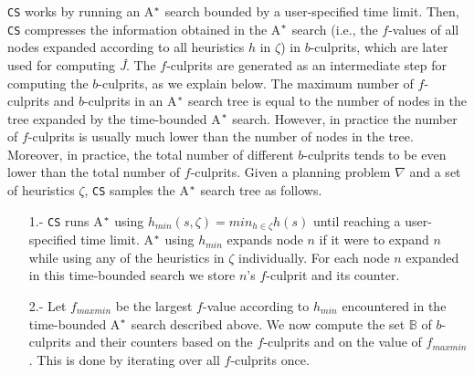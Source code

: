 \texttt{CS} works by running an A$\sp{*}$ search bounded by a user-specified time limit. Then, \texttt{CS} compresses the information obtained in the A$\sp{*}$ search (i.e., the $f$-values of all nodes expanded according to all heuristics $h$ in $\zeta$) in $b$-culprits, which are later used for computing \textit{\^{J}}. The $f$-culprits are generated as an intermediate step for computing the $b$-culprits, as we explain below. The maximum number of $f$-culprits and $b$-culprits in an A$\sp{*}$ search tree is equal to the number of nodes in the tree expanded by the time-bounded A$\sp{*}$ search. However, in practice the number of $f$-culprits is usually much lower than the number of nodes in the tree. Moreover, in practice, the total number of different $b$-culprits tends to be even lower than the total number of $f$-culprits. Given a planning problem $\nabla$ and a set of heuristics $\zeta$, \texttt{CS} samples the A$\sp{*}$ search tree as follows.

\begin{enumerate}
    \item[1.-] \texttt{CS} runs A$\sp{*}$ using $h_{min}(s,\zeta) = min_{h \in \zeta}h(s)$ until reaching a user-specified time limit. A$\sp{*}$ using $h_{min}$ expands node $n$ if it were to expand $n$ while using any of the heuristics in $\zeta$ individually. For each node $n$ expanded in this time-bounded search we store $n$'s $f$-culprit and its counter.
    \item[2.-] Let $f_{maxmin}$ be the largest $f$-value according to $h_{min}$ encountered in the time-bounded A$\sp{*}$ search described above. We now compute the set $\mathbb{B}$ of $b$-culprits and their counters based on the $f$-culprits and on the value of $f_{maxmin}$. This is done by iterating over all $f$-culprits once.

\end{enumerate}

